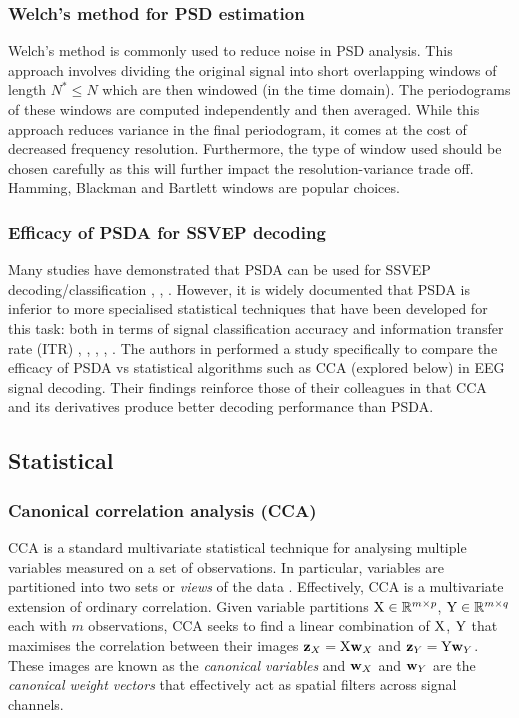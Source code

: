 \subsubsection{Welch's method for PSD estimation}
Welch's method is commonly used to reduce noise in PSD analysis. This approach involves dividing the original signal into short overlapping windows of length $N^* \leq N$ which are then windowed (in the time domain). The periodograms of these windows are computed independently and then averaged. While this approach reduces variance in the final periodogram, it comes at the cost of decreased frequency resolution. Furthermore, the type of window used should be chosen carefully as this will further impact the resolution-variance trade off. Hamming, Blackman and Bartlett windows are popular choices.

\subsubsection{Efficacy of PSDA for SSVEP decoding}
\label{subsection:psda-vs-cca}
Many studies have demonstrated that PSDA can be used for SSVEP decoding/classification \cite{zhao-stimulus-layout-effect}, \cite{bci-survey-nicolas-alonso}, \cite{acampora-dataset}. However, it is widely documented that PSDA is inferior to more specialised statistical techniques that have been developed for this task: both in terms of signal classification accuracy and information transfer rate (ITR) \cite{autthasan-single-chan-ssvep}, \cite{lin-cca-2006}, \cite{sun-gcca}, \cite{zhang-mset-cca}, \cite{hakvoort-cca-psda-comparison}. The authors in \cite{hakvoort-cca-psda-comparison} performed a study specifically to compare the efficacy of PSDA vs statistical algorithms such as CCA (explored below) in EEG signal decoding. Their findings reinforce those of their colleagues in that CCA and its derivatives produce better decoding performance than PSDA.

\newpage
\subsection{Statistical}

\subsubsection{Canonical correlation analysis (CCA)}
\label{subsection:CCA-c2}
CCA is a standard multivariate statistical technique for analysing multiple variables measured on a set of observations. In particular, variables are partitioned into two sets or \textit{views} of the data \cite{cca-tutorial}. Effectively, CCA is a multivariate extension of ordinary correlation. Given variable partitions ${\textrm{X}} \in \mathbb{R}^{m\times p}$, ${\textrm{Y}} \in \mathbb{R}^{m\times q}$ each with $m$ observations, CCA seeks to find a linear combination of ${\textrm{X}}$, ${\textrm{Y}}$ that maximises the correlation between their images ${\mathbf{z}}_X = {\textrm{X}}{\mathbf{w}}_X$ and ${\mathbf{z}}_Y = {\textrm{Y}}{\mathbf{w}}_Y$. These images are known as the \textit{canonical variables} and ${\mathbf{w}}_X$ and ${\mathbf{w}}_Y$ are the \textit{canonical weight vectors} that effectively act as spatial filters across signal channels.

